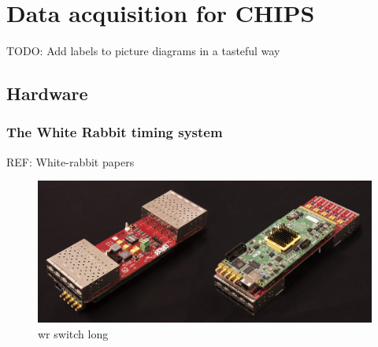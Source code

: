 \chapter{Data acquisition for CHIPS} %
\label{chap:daq} %

TODO: Add labels to picture diagrams in a tasteful way

\section{Hardware} %
\label{sec:daq_hard} %

\subsection{The White Rabbit timing system} %
\label{sec:daq_hard_timing} %

REF: White-rabbit papers

\begin{figure} %
    \includegraphics[width=\textwidth]{diagrams/5-daq/wr_switch.jpg}
    \caption[wr switch short]
    {wr switch long}
    \label{fig:wr_switch}
\end{figure}

